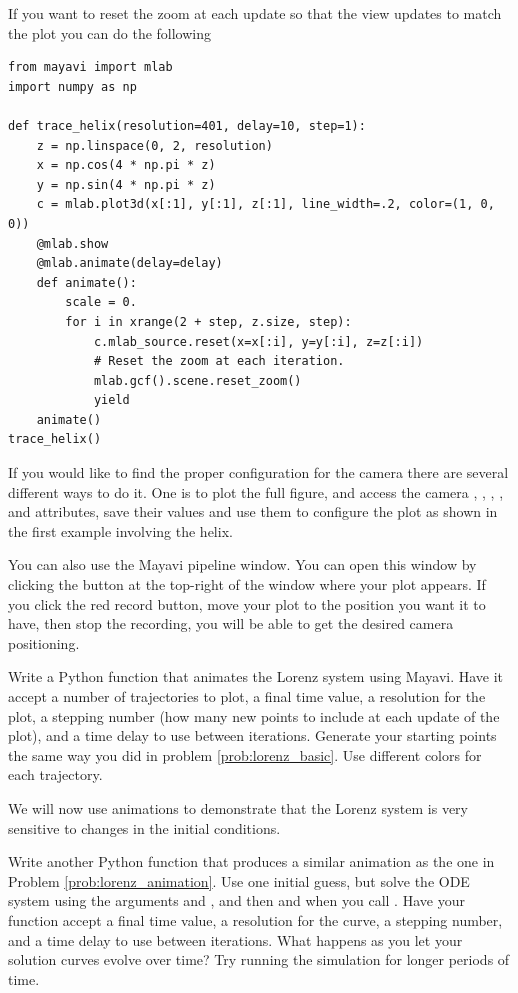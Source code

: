 If you want to reset the zoom at each update so that the view updates to match the plot you can do the following
\begin{lstlisting}
from mayavi import mlab
import numpy as np

def trace_helix(resolution=401, delay=10, step=1):
    z = np.linspace(0, 2, resolution)
    x = np.cos(4 * np.pi * z)
    y = np.sin(4 * np.pi * z)
    c = mlab.plot3d(x[:1], y[:1], z[:1], line_width=.2, color=(1, 0, 0))
    @mlab.show
    @mlab.animate(delay=delay)
    def animate():
        scale = 0.
        for i in xrange(2 + step, z.size, step):
            c.mlab_source.reset(x=x[:i], y=y[:i], z=z[:i])
            # Reset the zoom at each iteration.
            mlab.gcf().scene.reset_zoom()
            yield
    animate()
trace_helix()
\end{lstlisting}

If you would like to find the proper configuration for the camera there are several different ways to do it.
One is to plot the full figure, and access the camera , , , , and  attributes, save their values and use them to configure the plot as shown in the first example involving the helix.

You can also use the Mayavi pipeline window.
You can open this window by clicking the button at the top-right of the window where your plot appears.
If you click the red record button, move your plot to the position you want it to have, then stop the recording, you will be able to get the desired camera positioning.

\begin{problem}
\label{prob:lorenz_animation}
Write a Python function that animates the Lorenz system using Mayavi.
Have it accept a number of trajectories to plot, a final time value, a resolution for the plot, a stepping number (how many new points to include at each update of the plot), and a time delay to use between iterations.
Generate your starting points the same way you did in problem \ref{prob:lorenz_basic}.
Use different colors for each trajectory.
\end{problem}

We will now use animations to demonstrate that the Lorenz system is very sensitive to changes in the initial conditions.

\begin{problem}
\label{prob:lorenz_tol_sensitivity}
Write another Python function that produces a similar animation as the one in Problem \ref{prob:lorenz_animation}.
Use one initial guess, but solve the ODE system using the arguments  and , and then  and  when you call .
Have your function accept a final time value, a resolution for the curve, a stepping number, and a time delay to use between iterations.
What happens as you let your solution curves evolve over time?
Try running the simulation for longer periods of time.
\end{problem}

